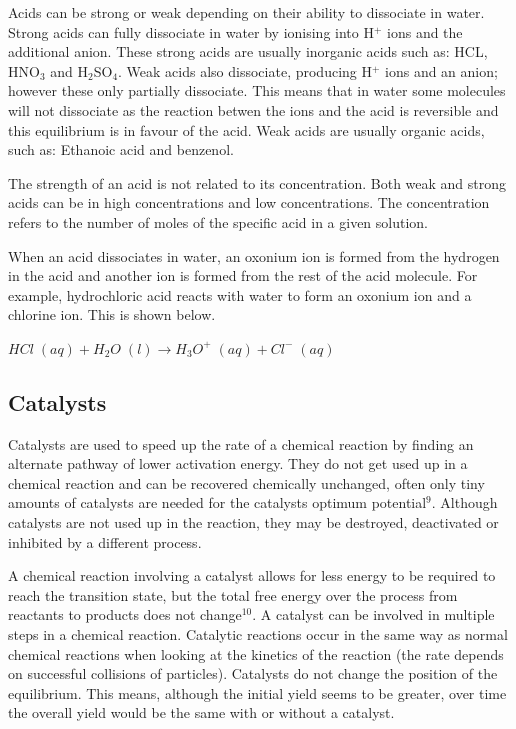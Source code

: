Acids can be strong or weak depending on their ability to dissociate in water. Strong acids can fully dissociate in water by ionising into H$^+$ ions and the additional anion. These strong acids are usually inorganic acids such as: HCL, HNO$_3$ and H$_2$SO$_4$. Weak acids also dissociate, producing H$^+$ ions and an anion; however these only partially dissociate. This means that in water some molecules will not dissociate as the reaction betwen the ions and the acid is reversible and this equilibrium is in favour of the acid. Weak acids are usually organic acids, such as: Ethanoic acid and benzenol. 

The strength of an acid is not related to its concentration. Both weak and strong acids can be in high concentrations and low concentrations. The concentration refers to the number of moles of the specific acid in a given solution.

When an acid dissociates in water, an oxonium ion is formed from the hydrogen in the acid and another ion is formed from the rest of the acid molecule. For example, hydrochloric acid reacts with water to form an oxonium ion and a chlorine ion. This is shown below.

$HCl \; (aq) + H_2O \; (l) \rightarrow H_3O^+ \; (aq) + Cl^- \; (aq)$




	\subsection{Catalysts} \label{catalysts}

Catalysts are used to speed up the rate of a chemical reaction by finding an alternate pathway of lower activation energy. They do not get used up in a chemical reaction and can be recovered chemically unchanged, often only tiny amounts of catalysts are needed for the catalysts optimum potential$^9$. Although catalysts are not used up in the reaction, they may be destroyed, deactivated or inhibited by a different process. 

A chemical reaction involving a catalyst allows for less energy to be required to reach the transition state, but the total free energy over the process from reactants to products does not change$^{10}$. A catalyst can be involved in multiple steps in a chemical reaction. Catalytic reactions occur in the same way as normal chemical reactions when looking at the kinetics of the reaction (the rate depends on successful collisions of particles). Catalysts do not change the position of the equilibrium. This means, although the initial yield seems to be greater, over time the overall yield would be the same with or without a catalyst. 

